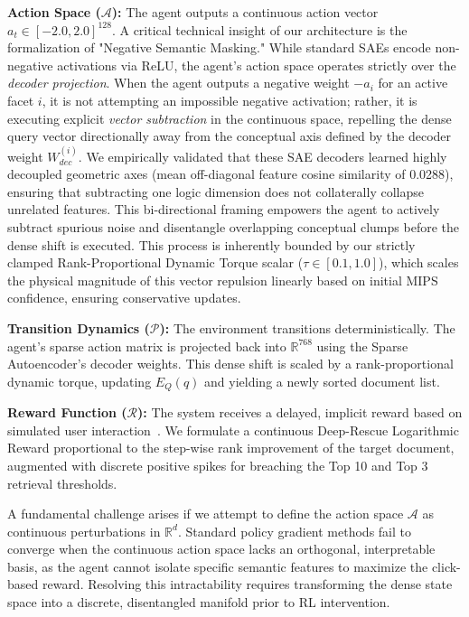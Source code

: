 \textbf{Action Space ($\mathcal{A}$):} The agent outputs a continuous action vector $a_t \in [-2.0, 2.0]^{128}$. A critical technical insight of our architecture is the formalization of "Negative Semantic Masking." While standard SAEs encode non-negative activations via ReLU, the agent's action space operates strictly over the \textit{decoder projection}. When the agent outputs a negative weight $-a_i$ for an active facet $i$, it is not attempting an impossible negative activation; rather, it is executing explicit \textit{vector subtraction} in the continuous space, repelling the dense query vector directionally away from the conceptual axis defined by the decoder weight $W_{dec}^{(i)}$. We empirically validated that these SAE decoders learned highly decoupled geometric axes (mean off-diagonal feature cosine similarity of 0.0288), ensuring that subtracting one logic dimension does not collaterally collapse unrelated features. This bi-directional framing empowers the agent to actively subtract spurious noise and disentangle overlapping conceptual clumps before the dense shift is executed. This process is inherently bounded by our strictly clamped Rank-Proportional Dynamic Torque scalar ($\tau \in [0.1, 1.0]$), which scales the physical magnitude of this vector repulsion linearly based on initial MIPS confidence, ensuring conservative updates.

\textbf{Transition Dynamics ($\mathcal{P}$):} The environment transitions deterministically. The agent's sparse action matrix is projected back into $\mathbb{R}^{768}$ using the Sparse Autoencoder's decoder weights. This dense shift is scaled by a rank-proportional dynamic torque, updating $E_Q(q)$ and yielding a newly sorted document list.

\textbf{Reward Function ($\mathcal{R}$):} The system receives a delayed, implicit reward based on simulated user interaction~\citep{joachims2002}. We formulate a continuous Deep-Rescue Logarithmic Reward proportional to the step-wise rank improvement of the target document, augmented with discrete positive spikes for breaching the Top 10 and Top 3 retrieval thresholds.

A fundamental challenge arises if we attempt to define the action space $\mathcal{A}$ as continuous perturbations in $\mathbb{R}^d$. Standard policy gradient methods fail to converge when the continuous action space lacks an orthogonal, interpretable basis, as the agent cannot isolate specific semantic features to maximize the click-based reward. Resolving this intractability requires transforming the dense state space into a discrete, disentangled manifold prior to RL intervention.

